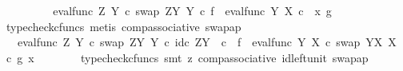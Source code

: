 \begin{isabellebody}
\ \ \ \ \isamarkupfalse%
\ \isamarkupfalse%
\ {\isachardoublequoteopen}{\isachardot}{\kern0pt}{\isachardot}{\kern0pt}{\isachardot}{\kern0pt}\ {\isacharequal}{\kern0pt}\ {\isacharparenleft}{\kern0pt}eval{\isacharunderscore}{\kern0pt}func\ Z\ Y\ {\isasymcirc}\isactrlsub c\ swap\ {\isacharparenleft}{\kern0pt}Z\isactrlbsup Y\isactrlesup {\isacharparenright}{\kern0pt}\ Y{\isacharparenright}{\kern0pt}\ {\isasymcirc}\isactrlsub c\ {\isasymlangle}f\ {\isacharcomma}{\kern0pt}\ eval{\isacharunderscore}{\kern0pt}func\ Y\ X\ {\isasymcirc}\isactrlsub c\ \ {\isasymlangle}x{\isacharcomma}{\kern0pt}\ g{\isasymrangle}{\isasymrangle}{\isachardoublequoteclose}\isanewline
\ \ \ \ \ \ \isamarkupfalse%
\ {\isacharparenleft}{\kern0pt}typecheck{\isacharunderscore}{\kern0pt}cfuncs{\isacharcomma}{\kern0pt}\ metis\ comp{\isacharunderscore}{\kern0pt}associative{}\ swap{\isacharunderscore}{\kern0pt}ap{\isacharparenright}{\kern0pt}\isanewline
\ \ \ \ \isamarkupfalse%
\ \isamarkupfalse%
\ {\isachardoublequoteopen}{\isachardot}{\kern0pt}{\isachardot}{\kern0pt}{\isachardot}{\kern0pt}\ {\isacharequal}{\kern0pt}\ {\isacharparenleft}{\kern0pt}eval{\isacharunderscore}{\kern0pt}func\ Z\ Y\ {\isasymcirc}\isactrlsub c\ swap\ {\isacharparenleft}{\kern0pt}Z\isactrlbsup Y\isactrlesup {\isacharparenright}{\kern0pt}\ Y{\isacharparenright}{\kern0pt}\ {\isasymcirc}\isactrlsub c\ {\isasymlangle}id\isactrlsub c\ {\isacharparenleft}{\kern0pt}Z\isactrlbsup Y\isactrlesup {\isacharparenright}{\kern0pt}\ \ {\isasymcirc}\isactrlsub c\ \ f\ {\isacharcomma}{\kern0pt}\ {\isacharparenleft}{\kern0pt}eval{\isacharunderscore}{\kern0pt}func\ Y\ X\ {\isasymcirc}\isactrlsub c\ swap\ {\isacharparenleft}{\kern0pt}Y\isactrlbsup X\isactrlesup {\isacharparenright}{\kern0pt}\ X{\isacharparenright}{\kern0pt}\ \ {\isasymcirc}\isactrlsub c\ {\isasymlangle}g{\isacharcomma}{\kern0pt}\ x{\isasymrangle}{\isasymrangle}{\isachardoublequoteclose}\isanewline
\ \ \ \ \ \ \isamarkupfalse%
\ {\isacharparenleft}{\kern0pt}typecheck{\isacharunderscore}{\kern0pt}cfuncs{\isacharcomma}{\kern0pt}\ smt\ {\isacharparenleft}{\kern0pt}z{}{\isacharparenright}{\kern0pt}\ comp{\isacharunderscore}{\kern0pt}associative{}\ id{\isacharunderscore}{\kern0pt}left{\isacharunderscore}{\kern0pt}unit{}\ swap{\isacharunderscore}{\kern0pt}ap{\isacharparenright}{\kern0pt}\isanewline
\ \ \ \ \isamarkupfalse%
\ \isamarkupfalse%

\end{isabellebody}
